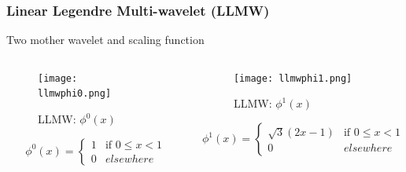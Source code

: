 \begin{frame}\frametitle{Linear Legendre Multi-wavelet (LLMW)}
Two mother wavelet and scaling function
    \begin{columns}[T]
      \begin{column}{.5\textwidth}
      
              \begin{figure}
              \centering
              \texttt{[image: llmwphi0.png]}
              \caption{LLMW: $\phi^0(x)$}
              \label{fig_e_vs_n_f1}
              \end{figure}
              \tiny{

              \begin{equation}
              \phi^0(x)=
              \left\{
                  \begin{array}{ll}
                      1  & \mbox{if } 0 \leq x < 1 \\
                      0 & elsewhere
                  \end{array}
              \right.
              \nonumber
              \end{equation}}



      \end{column}
      \begin{column}{.5\textwidth}
              \begin{figure}
              \centering
              \texttt{[image: llmwphi1.png]}
              \caption{LLMW: $\phi^1(x)$}
              \label{fig_e_vs_n_f2}
              \end{figure}
              \tiny{

              \begin{equation}
              \phi^1(x)=
              \left\{
                  \begin{array}{ll}
                      \sqrt{3}(2x-1)  & \mbox{if } 0 \leq x < 1 \\
                      0 & elsewhere
                  \end{array}
              \right.
              \nonumber
              \end{equation}}
        \end{column}
      \end{columns}
\end{frame}

